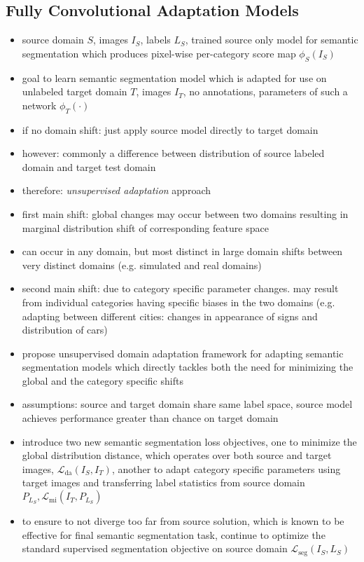 \documentclass[]{article}
\begin{document}
\subsection{Fully Convolutional Adaptation Models}
\begin{itemize}
	\item source domain $S$, images $I_S$, labels $L_S$, trained source only model for semantic segmentation which produces pixel-wise per-category score map $\phi_S(I_S)$
	\item goal to learn semantic segmentation model which is adapted for use on unlabeled target domain $T$, images $I_T$, no annotations, parameters of such a network $\phi_T(\cdot)$
	\item if no domain shift: just apply source model directly to target domain
	\item however: commonly a difference between distribution of source labeled domain and target test domain
	\item therefore: \textit{unsupervised adaptation} approach
	\item first main shift: global changes may occur between two domains resulting in marginal distribution shift of corresponding feature space
	\item can occur in any domain, but most distinct in large domain shifts between very distinct domains (e.g. simulated and real domains)
	\item second main shift: due to category specific parameter changes. may result from individual categories having specific biases in the two domains (e.g. adapting between different cities: changes in appearance of signs and distribution of cars)
	\item propose unsupervised domain adaptation framework for adapting semantic segmentation models which directly tackles both the need for minimizing the global and the category specific shifts
	\item assumptions: source and target domain share same label space, source model achieves performance greater than chance on target domain
	\item introduce two new semantic segmentation loss objectives, one to minimize the global distribution distance, which operates over both source and target images, $\mathcal{L}_{\text{da}}(I_S, I_T)$, another to adapt category specific parameters using target images and transferring label statistics from source domain $P_{L_S}, \mathcal{L}_{\text{mi}}(I_T,P_{L_S})$
	\item to ensure to not diverge too far from source solution, which is known to be effective for final semantic segmentation task, continue to optimize the standard supervised segmentation objective on source domain $\mathcal{L}_{\text{seg}}(I_S, L_S)$

\end{itemize}
\end{document}
